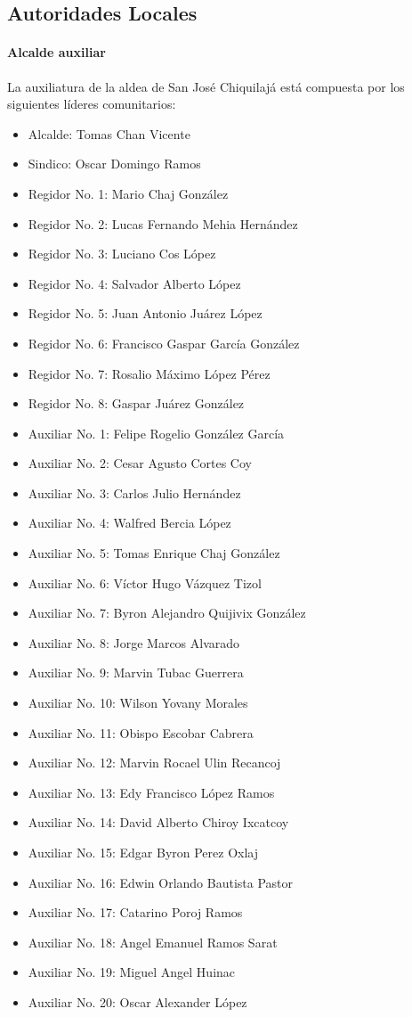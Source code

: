 \documentclass{article}
\begin{document}
\subsection{Autoridades Locales}

\paragraph{Alcalde auxiliar}
La auxiliatura de la aldea de San José Chiquilajá está compuesta por los siguientes líderes comunitarios:
\begin{itemize}
	\item Alcalde: Tomas Chan Vicente
	\item Sindico: Oscar Domingo Ramos
	\item Regidor No. 1: Mario Chaj González
	\item Regidor No. 2: Lucas Fernando Mehia Hernández
	\item Regidor No. 3: Luciano Cos López
	\item Regidor No. 4: Salvador Alberto López
	\item Regidor No. 5: Juan Antonio Juárez López
	\item Regidor No. 6: Francisco Gaspar García González
	\item Regidor No. 7: Rosalio Máximo López Pérez
	\item Regidor No. 8: Gaspar Juárez González
	\item Auxiliar No. 1: Felipe Rogelio González García
	\item Auxiliar No. 2: Cesar Agusto Cortes Coy
	\item Auxiliar No. 3: Carlos Julio Hernández
	\item Auxiliar No. 4: Walfred Bercia López
	\item Auxiliar No. 5: Tomas Enrique Chaj González
	\item Auxiliar No. 6: Víctor Hugo Vázquez Tizol
	\item Auxiliar No. 7: Byron Alejandro Quijivix González
	\item Auxiliar No. 8: Jorge Marcos Alvarado
	\item Auxiliar No. 9: Marvin Tubac Guerrera
	\item Auxiliar No. 10: Wilson Yovany Morales
	\item Auxiliar No. 11: Obispo Escobar Cabrera
	\item Auxiliar No. 12: Marvin Rocael Ulin Recancoj
	\item Auxiliar No. 13: Edy Francisco López Ramos
	\item Auxiliar No. 14: David Alberto Chiroy Ixcatcoy
	\item Auxiliar No. 15: Edgar Byron Perez Oxlaj
	\item Auxiliar No. 16: Edwin Orlando Bautista Pastor
	\item Auxiliar No. 17: Catarino Poroj Ramos
	\item Auxiliar No. 18: Angel Emanuel Ramos Sarat
	\item Auxiliar No. 19: Miguel Angel Huinac
	\item Auxiliar No. 20: Oscar Alexander López
\end{itemize}
\end{document}

